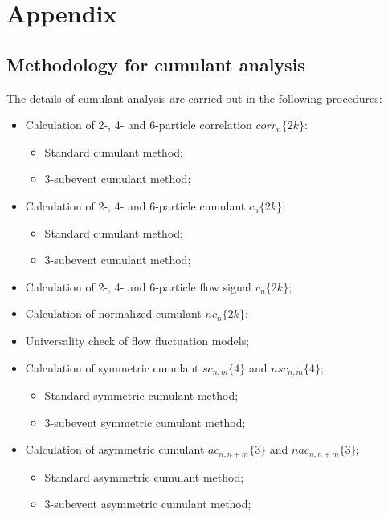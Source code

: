 \section{Appendix}
\label{chapter:appendix}

\subsection{Methodology for cumulant analysis}
\label{sec:methodology_for_cumulant_analysis}
The details of cumulant analysis are carried out in the following procedures:
\begin{itemize}
\item Calculation of 2-, 4- and 6-particle correlation $corr_n\{2k\}$:
\begin{itemize}
\item Standard cumulant method;
\item 3-subevent cumulant method;
\end{itemize}
\item Calculation of 2-, 4- and 6-particle cumulant $c_n\{2k\}$:
\begin{itemize}
\item Standard cumulant method;
\item 3-subevent cumulant method;
\end{itemize}
\item Calculation of 2-, 4- and 6-particle flow signal $v_n\{2k\}$;
\item Calculation of normalized cumulant $nc_n\{2k\}$;
\item Universality check of flow fluctuation models;
\item Calculation of symmetric cumulant $sc_{n,m}\{4\}$ and $nsc_{n,m}\{4\}$;
\begin{itemize}
\item Standard symmetric cumulant method;
\item 3-subevent symmetric cumulant method;
\end{itemize}
\item Calculation of asymmetric cumulant $ac_{n,n+m}\{3\}$ and $nac_{n,n+m}\{3\}$;
\begin{itemize}
\item Standard asymmetric cumulant method;
\item 3-subevent asymmetric cumulant method;
\end{itemize}
\end{itemize}



